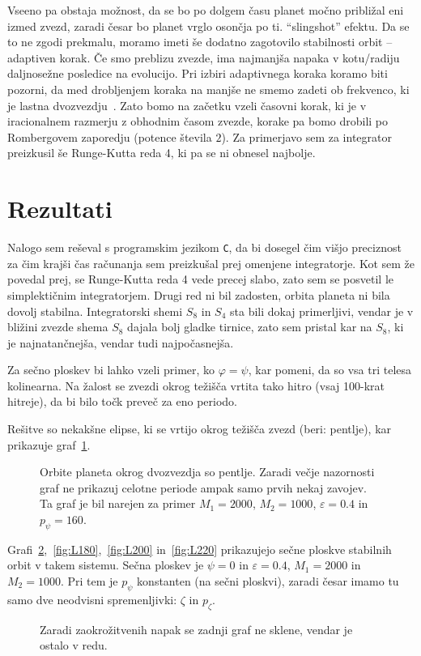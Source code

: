 \documentclass[12pt, a4paper]{article}
\begin{document}
Vseeno pa obstaja mo\v znost, da se bo po dolgem \v casu planet mo\v cno pribli\v zal eni izmed
zvezd, zaradi \v cesar bo planet vrglo oson\v cja po ti. "`slingshot"' efektu. Da se to ne zgodi prekmalu, moramo
imeti \v se dodatno zagotovilo stabilnosti orbit -- adaptiven korak. \v Ce smo preblizu zvezde, ima najmanj\v sa
napaka v kotu/radiju daljnose\v zne posledice na evolucijo. Pri izbiri adaptivnega koraka koramo biti pozorni,
da med drobljenjem koraka na manj\v se ne smemo zadeti ob frekvenco, ki je lastna dvozvezdju~\cite{richardson}.
Zato bomo na za\v cetku vzeli \v casovni korak, ki je v iracionalnem razmerju z obhodnim \v casom zvezde, korake
pa bomo drobili po Rombergovem zaporedju (potence \v stevila $2$). Za primerjavo sem za integrator preizkusil
\v se Runge-Kutta reda 4, ki pa se ni obnesel najbolje.

\section{Rezultati}

Nalogo sem re\v seval s programskim jezikom {\tt C}, da bi dosegel \v cim vi\v sjo preciznost za \v cim
kraj\v si \v cas ra\v cunanja sem preizku\v sal prej omenjene integratorje. Kot sem \v ze povedal prej,
se Runge-Kutta reda 4 vede precej slabo, zato sem se posvetil le simplekti\v cnim integratorjem. Drugi
red ni bil zadosten, orbita planeta ni bila dovolj stabilna. Integratorski shemi $S_8$ in $S_4$ sta bili
dokaj primerljivi, vendar je v bli\v zini zvezde shema $S_8$ dajala bolj gladke tirnice, zato sem pristal
kar na $S_8$, ki je najnatan\v cnej\v sa, vendar tudi najpo\v casnej\v sa.

Za se\v cno ploskev bi lahko vzeli primer, ko $\varphi = \psi$, kar pomeni, da so vsa tri telesa kolinearna.
Na \v zalost se zvezdi okrog te\v zi\v s\v ca vrtita tako hitro (vsaj 100-krat hitreje), da bi bilo
to\v ck preve\v c za eno periodo.

Re\v sitve so nekak\v sne elipse, ki se vrtijo okrog te\v zi\v s\v ca zvezd (beri: pentlje), kar prikazuje
graf~\ref{fig:pentlja}. 
\pagebreak
\begin{figure}[H]\centering
	
	\caption{Orbite planeta okrog dvozvezdja so pentlje. Zaradi ve\v cje nazornosti graf ne prikazuj
		celotne periode ampak samo prvih nekaj zavojev. Ta graf je bil narejen za primer $M_1 = 2000$,
		$M_2 = 1000$, $\varepsilon = 0.4$ in $p_\psi = 160.$}
	\label{fig:pentlja}
\end{figure}
Grafi~\ref{fig:L160},~\ref{fig:L180},~\ref{fig:L200} in~\ref{fig:L220} prikazujejo se\v cne ploskve stabilnih
orbit v takem sistemu. Se\v cna ploskev je $\psi = 0$ in $\varepsilon = 0.4$, $M_1 = 2000$ in $M_2 = 1000$.
Pri tem je $p_\psi$ konstanten (na se\v cni ploskvi), zaradi \v cesar imamo tu samo dve neodvisni
spremenljivki: $\zeta$ in $p_\zeta$.
\begin{figure}[H]\centering
	
	\caption{Zaradi zaokro\v zitvenih napak se zadnji graf ne sklene, vendar je ostalo v redu.}
	\label{fig:L160}
\end{figure}
\end{document}
